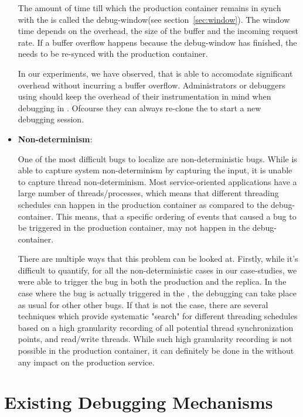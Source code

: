 \begin{itemize}
	The amount of time till which the production container remains in synch with the \debugcontainer is called the debug-window(see section~\ref{sec:window}). The window time depends on the overhead, the size of the buffer and the incoming request rate. If a buffer overflow happens because the debug-window has finished, the \debugcontainer needs to be re-synced with the production container.
	
	In our experiments, we have observed, that \parikshan is able to accomodate significant overhead without incurring a buffer overflow.	
	Administrators or debuggers using \parikshan should keep the overhead of their instrumentation in mind when debugging in \parikshan. Ofcourse they can always re-clone the \productioncontainer to start a new debugging session.
	
	\item \textbf{Non-determinism}:
	
	One of the most difficult bugs to localize are non-deterministic bugs. While \parikshan is able to capture system non-determinism by capturing the input, it is unable to capture thread non-determinism. Most service-oriented applications have a large number of threads/processes, which means that different threading schedules can happen in the production container as compared to the debug-container.
	This means, that a specific ordering of events that caused a bug to be triggered in the production container, may not happen in the debug-container.
	
	There are multiple ways that this problem can be looked at. Firstly, while it's difficult to quantify, for all the non-deterministic cases in our case-studies, we were able to trigger the bug in both the production and the replica. 
	In the case where the bug is actually triggered in the \debugcontainer, the debugging can take place as usual for other other bugs.
	If that is not the case, there are several techniques which provide systematic "search" for different threading schedules based on a high granularity recording of all potential thread synchronization points, and read/write threads. While such high granularity recording is not possible in the production container, it can definitely be done in the \debugcontainer without any impact on the production service.
	
\end{itemize}


\section{Existing Debugging Mechanisms}

